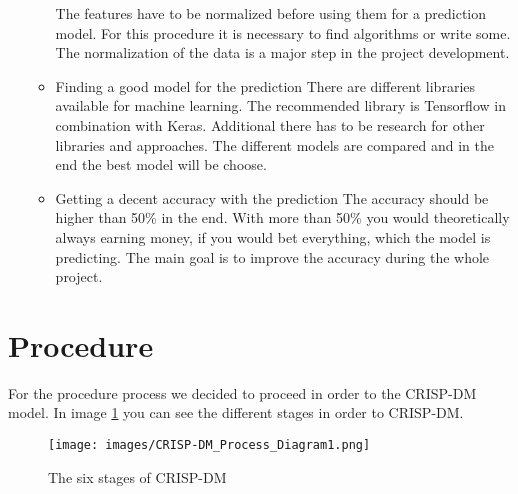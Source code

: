 \begin{itemize}
\begin{itemize}
			The features have to be normalized before using them for a prediction model. For this procedure it is necessary to find algorithms or write some. The normalization of the data is a major step in the project development.
			\item Finding a good model for the prediction 
			There are different libraries available for machine learning. The recommended library is Tensorflow in combination with Keras. Additional there has to be research for other libraries and approaches. The different models are compared and in the end the best model will be choose. 
			\item Getting a decent accuracy with the prediction \newline
			The accuracy should be higher than 50\% in the end. With more than 50\% you would theoretically always earning money, if you would bet everything, which the model is predicting. The main goal is to improve the accuracy during the whole project. 
		\end{itemize}
\end{itemize}
\section{Procedure}

For the procedure process we decided to proceed in order to the CRISP-DM model. In image \ref{CRISImage} you can see the different stages in order to CRISP-DM.

\begin{figure}[h]
\centering
\texttt{[image: images/CRISP-DM\_Process\_Diagram1.png]}
\caption{The six stages of CRISP-DM \cite{CRISPDig:2012}}
\label{CRISImage}
\end{figure}

